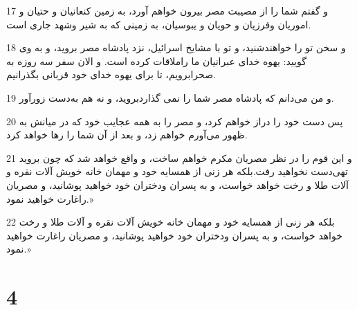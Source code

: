 \par 17 و گفتم شما را از مصیبت مصر بیرون خواهم آورد، به زمین کنعانیان و حتیان و اموریان وفرزیان و حویان و یبوسیان، به زمینی که به شیر وشهد جاری است.
\par 18 و سخن تو را خواهندشنید، و تو با مشایخ اسرائیل، نزد پادشاه مصر بروید، و به وی گویید: یهوه خدای عبرانیان ما راملاقات کرده است. و الان سفر سه روزه به صحرابرویم، تا برای یهوه خدای خود قربانی بگذرانیم.
\par 19 و من می‌دانم که پادشاه مصر شما را نمی گذاردبروید، و نه هم به‌دست زورآور.
\par 20 پس دست خود را دراز خواهم کرد، و مصر را به همه عجایب خود که در میانش به ظهور می‌آورم خواهم زد، و بعد از آن شما را رها خواهد کرد.
\par 21 و این قوم را در نظر مصریان مکرم خواهم ساخت، و واقع خواهد شد که چون بروید تهی‌دست نخواهید رفت.بلکه هر زنی از همسایه خود و مهمان خانه خویش آلات نقره و آلات طلا و رخت خواهد خواست، و به پسران ودختران خود خواهید پوشانید، و مصریان راغارت خواهید نمود.»
\par 22 بلکه هر زنی از همسایه خود و مهمان خانه خویش آلات نقره و آلات طلا و رخت خواهد خواست، و به پسران ودختران خود خواهید پوشانید، و مصریان راغارت خواهید نمود.»
 
\chapter{4}

